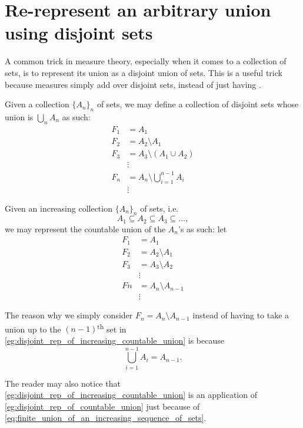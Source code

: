 \documentclass[notoc,notitlepage]{tufte-book}
\begin{document}
\section{Re-represent an arbitrary union using disjoint sets}%
\label{sec:re_represent_an_arbitrary_union_using_disjoint_sets}

A common trick in measure theory,
especially when it comes to a collection of sets,
is to represent its union as a disjoint union of sets.
This is a useful trick because measures simply add over disjoint sets,
instead of just having .

\begin{eg}\label{eg:disjoint_rep_of_countable_union}
  Given a collection $\{ A_n \}_{n}$ of sets, we may define a collection of
  disjoint sets whose union is $\bigcup_{n} A_n$ as such:
  \begin{align*}
    F_1 &= A_1 \\
    F_2 &= A_2 \setminus A_1 \\
    F_3 &= A_3 \setminus (A_1 \cup A_2) \\
        &\vdots \\
    F_n &= A_n \setminus \bigcup_{i=1}^{n-1} A_i \\
        &\vdots
  \end{align*}
\end{eg}

\begin{eg}\label{eg:disjoint_rep_of_increasing_countable_union}
  Given an increasing collection $\{ A_n \}_{n}$ of sets, i.e.
  \begin{equation*}
    A_1 \subseteq A_2 \subseteq A_3 \subseteq \hdots,
  \end{equation*}
  we may represent the countable union of the $A_n$'s as such:
  let
  \begin{align*}
    F_1 &= A_1 \\
    F_2 &= A_2 \setminus A_1 \\
    F_3 &= A_3 \setminus A_2 \\
        &\vdots \\
    Fn &= A_n \setminus A_{n-1} \\
       &\vdots
  \end{align*}
\end{eg}

\begin{remark}
  The reason why we simply consider $F_n = A_n \setminus A_{n-1}$ instead
  of having to take a union up to the $(n-1)$\textsuperscript{th}
  set in \cref{eg:disjoint_rep_of_increasing_countable_union}
  is because
  \begin{equation}\label{eq:finite_union_of_an_increasing_sequence_of_sets}
    \bigcup_{i=1}^{n-1} A_i = A_{n-1}.
  \end{equation}

  The reader may also notice that
  \cref{eg:disjoint_rep_of_increasing_countable_union}
  is an application of \cref{eg:disjoint_rep_of_countable_union}
  just because of \cref{eq:finite_union_of_an_increasing_sequence_of_sets}.
\end{remark}
\end{document}
